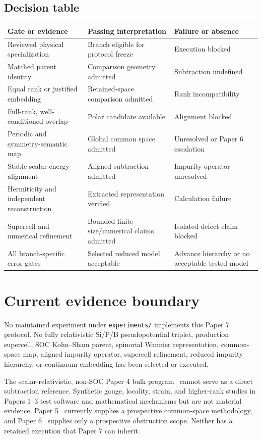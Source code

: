 \documentclass[11pt]{article}
\newenvironment{prospective}{\color{prospectivered}}{}
\begin{document}
\begin{prospective}
\subsection{Decision table}
\begin{center}\small
\begin{tabularx}{\textwidth}{YYY}
\toprule
\textbf{Gate or evidence} & \textbf{Passing interpretation} &
\textbf{Failure or absence} \\
\midrule
Reviewed physical specialization & Branch eligible for protocol freeze & Execution blocked \\
Matched parent identity & Comparison geometry admitted & Subtraction undefined \\
Equal rank or justified embedding & Retained-space comparison admitted & Rank incompatibility \\
Full-rank, well-conditioned overlap & Polar candidate available & Alignment blocked \\
Periodic and symmetry-semantic map & Global common space admitted & Unresolved or Paper 6 escalation \\
Stable scalar energy alignment & Aligned subtraction admitted & Impurity operator unresolved \\
Hermiticity and independent reconstruction & Extracted representation verified & Calculation failure \\
Supercell and numerical refinement & Bounded finite-size/numerical claims admitted & Isolated-defect claim blocked \\
All branch-specific error gates & Selected reduced model acceptable & Advance hierarchy or no acceptable tested model \\
\bottomrule
\end{tabularx}
\end{center}
\end{prospective}

\section{Current evidence boundary}
No maintained experiment under \texttt{experiments/} implements this Paper 7 protocol.
No fully relativistic Si/P/B pseudopotential triplet, production supercell, SOC
Kohn--Sham parent, spinorial Wannier representation, common-space map, aligned impurity
operator, supercell refinement, reduced impurity hierarchy, or continuum embedding has
been selected or executed.

The scalar-relativistic, non-SOC Paper 4 bulk program~\cite{Ragasa2026d} cannot serve as
a direct subtraction reference. Synthetic gauge, locality, strain, and higher-rank
studies in Papers 1--3 test software and mathematical mechanisms but are not material
evidence. Paper 5~\cite{Ragasa2026e} currently supplies a prospective common-space
methodology, and Paper 6~\cite{Ragasa2026f} supplies only a prospective obstruction
scope. Neither has a retained execution that Paper 7 can inherit.
\end{document}
